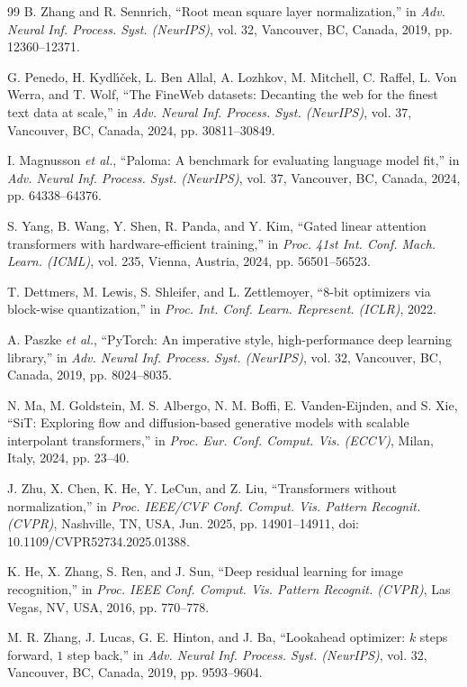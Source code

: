 \documentclass[11pt,a4paper]{article}
\renewcommand{\_}{\origunderscore\allowbreak}
\begin{document}
\begin{thebibliography}{99}
B. Zhang and R. Sennrich, ``Root mean square layer normalization,'' in \textit{Adv. Neural Inf. Process. Syst. (NeurIPS)}, vol. 32, Vancouver, BC, Canada, 2019, pp. 12360--12371.

G. Penedo, H. Kydl\'\i\v{c}ek, L. Ben Allal, A. Lozhkov, M. Mitchell, C. Raffel, L. Von Werra, and T. Wolf, ``The FineWeb datasets: Decanting the web for the finest text data at scale,'' in \textit{Adv. Neural Inf. Process. Syst. (NeurIPS)}, vol. 37, Vancouver, BC, Canada, 2024, pp. 30811--30849.

I. Magnusson \textit{et al.}, ``Paloma: A benchmark for evaluating language model fit,'' in \textit{Adv. Neural Inf. Process. Syst. (NeurIPS)}, vol. 37, Vancouver, BC, Canada, 2024, pp. 64338--64376.

S. Yang, B. Wang, Y. Shen, R. Panda, and Y. Kim, ``Gated linear attention transformers with hardware-efficient training,'' in \textit{Proc. 41st Int. Conf. Mach. Learn. (ICML)}, vol. 235, Vienna, Austria, 2024, pp. 56501--56523.

T. Dettmers, M. Lewis, S. Shleifer, and L. Zettlemoyer, ``8-bit optimizers via block-wise quantization,'' in \textit{Proc. Int. Conf. Learn. Represent. (ICLR)}, 2022.

A. Paszke \textit{et al.}, ``PyTorch: An imperative style, high-performance deep learning library,'' in \textit{Adv. Neural Inf. Process. Syst. (NeurIPS)}, vol. 32, Vancouver, BC, Canada, 2019, pp. 8024--8035.

N. Ma, M. Goldstein, M. S. Albergo, N. M. Boffi, E. Vanden-Eijnden, and S. Xie, ``SiT: Exploring flow and diffusion-based generative models with scalable interpolant transformers,'' in \textit{Proc. Eur. Conf. Comput. Vis. (ECCV)}, Milan, Italy, 2024, pp. 23--40.

J. Zhu, X. Chen, K. He, Y. LeCun, and Z. Liu, ``Transformers without normalization,'' in \textit{Proc. IEEE/CVF Conf. Comput. Vis. Pattern Recognit. (CVPR)}, Nashville, TN, USA, Jun. 2025, pp. 14901--14911, doi: 10.1109/CVPR52734.2025.01388.

K. He, X. Zhang, S. Ren, and J. Sun, ``Deep residual learning for image recognition,'' in \textit{Proc. IEEE Conf. Comput. Vis. Pattern Recognit. (CVPR)}, Las Vegas, NV, USA, 2016, pp. 770--778.

M. R. Zhang, J. Lucas, G. E. Hinton, and J. Ba, ``Lookahead optimizer: $k$ steps forward, $1$ step back,'' in \textit{Adv. Neural Inf. Process. Syst. (NeurIPS)}, vol. 32, Vancouver, BC, Canada, 2019, pp. 9593--9604.


\end{thebibliography}
\end{document}
